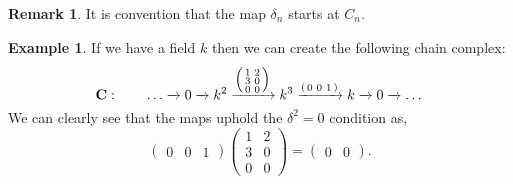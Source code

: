 \documentclass[11.5pt, twoside, a4paper, titlepage]{report}
\theoremstyle{definition}
\newtheorem{rem}[mydef]{Remark}
\newtheorem{eg}[mydef]{Example}
\theoremstyle{plain}
\begin{document}
\begin{rem}
It is convention that the map $\delta_n$ starts at $C_n$.
\end{rem}

\begin{eg}
If we have a field $k$ then we can create the following chain complex:
\begin{equation*}
\mathbf{C}: \qquad \dots \xrightarrow{} 0 \xrightarrow{} k^2 \xrightarrow{\Bigl(\begin{smallmatrix}1&2\\ 3&0\\ 0&0 \end{smallmatrix}\Bigr)} k^3 \xrightarrow{(\begin{smallmatrix}0 & 0 &1\end{smallmatrix})} k \xrightarrow{} 0 \xrightarrow{}\dots
\end{equation*}
We can clearly see that the maps uphold the $\delta^2=0$ condition as,
\begin{equation*}
\begin{pmatrix}0 & 0 &1
\end{pmatrix}
\begin{pmatrix}
1 & 2 \\
3 & 0\\
0 & 0
\end{pmatrix}
=\begin{pmatrix}
0 & 0
\end{pmatrix}.
\end{equation*}
\end{eg}
\end{document}
